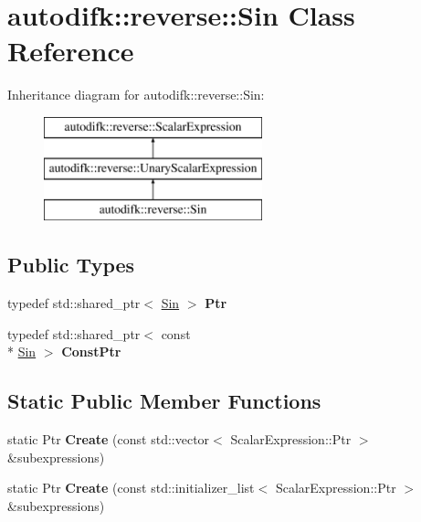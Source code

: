 \hypertarget{classautodifk_1_1reverse_1_1_sin}{\section{autodifk\-:\-:reverse\-:\-:Sin Class Reference}
\label{classautodifk_1_1reverse_1_1_sin}
}
Inheritance diagram for autodifk\-:\-:reverse\-:\-:Sin\-:\begin{figure}[H]
\begin{center}
\leavevmode
\includegraphics[height=3.000000cm]{classautodifk_1_1reverse_1_1_sin}
\end{center}
\end{figure}
\subsection*{Public Types}
\begin{DoxyCompactItemize}
\item 
\hypertarget{classautodifk_1_1reverse_1_1_sin_a4c07c2b96e3ee3654f7c251e4a08d965}{typedef std\-::shared\-\_\-ptr$<$ \hyperlink{classautodifk_1_1reverse_1_1_sin}{Sin} $>$ {\bfseries Ptr}}\label{classautodifk_1_1reverse_1_1_sin_a4c07c2b96e3ee3654f7c251e4a08d965}

\item 
\hypertarget{classautodifk_1_1reverse_1_1_sin_a2f3caf70999fc6bb5c6c4902e34d018a}{typedef std\-::shared\-\_\-ptr$<$ const \\*
\hyperlink{classautodifk_1_1reverse_1_1_sin}{Sin} $>$ {\bfseries Const\-Ptr}}\label{classautodifk_1_1reverse_1_1_sin_a2f3caf70999fc6bb5c6c4902e34d018a}

\end{DoxyCompactItemize}
\subsection*{Static Public Member Functions}
\begin{DoxyCompactItemize}
\item 
\hypertarget{classautodifk_1_1reverse_1_1_sin_a36c55f4b49a9944af4461c6bebaea991}{static Ptr {\bfseries Create} (const std\-::vector$<$ Scalar\-Expression\-::\-Ptr $>$ \&subexpressions)}\label{classautodifk_1_1reverse_1_1_sin_a36c55f4b49a9944af4461c6bebaea991}

\item 
\hypertarget{classautodifk_1_1reverse_1_1_sin_af3d7caaa42034f30ded25ed7c6f0c0a0}{static Ptr {\bfseries Create} (const std\-::initializer\-\_\-list$<$ Scalar\-Expression\-::\-Ptr $>$ \&subexpressions)}\label{classautodifk_1_1reverse_1_1_sin_af3d7caaa42034f30ded25ed7c6f0c0a0}

\end{DoxyCompactItemize}
